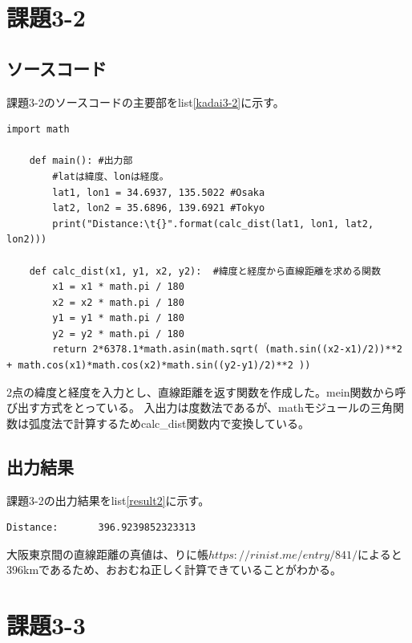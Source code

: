 \documentclass[a4paper]{ltjsarticle}
\begin{document}
\section*{課題3-2}
\subsection*{ソースコード}
課題3-2のソースコードの主要部をlist\ref{kadai3-2}に示す。
\begin{lstlisting}[caption=kadai3-2.py,label=kadai3-2]
    import math

    def main(): #出力部
        #latは緯度、lonは経度。
        lat1, lon1 = 34.6937, 135.5022 #Osaka
        lat2, lon2 = 35.6896, 139.6921 #Tokyo
        print("Distance:\t{}".format(calc_dist(lat1, lon1, lat2, lon2)))

    def calc_dist(x1, y1, x2, y2):  #緯度と経度から直線距離を求める関数
        x1 = x1 * math.pi / 180
        x2 = x2 * math.pi / 180
        y1 = y1 * math.pi / 180
        y2 = y2 * math.pi / 180
        return 2*6378.1*math.asin(math.sqrt( (math.sin((x2-x1)/2))**2 + math.cos(x1)*math.cos(x2)*math.sin((y2-y1)/2)**2 ))
\end{lstlisting}
2点の緯度と経度を入力とし、直線距離を返す関数を作成した。mein関数から呼び出す方式をとっている。
入出力は度数法であるが、mathモジュールの三角関数は弧度法で計算するためcalc\_dist関数内で変換している。

\subsection*{出力結果}
課題3-2の出力結果をlist\ref{result2}に示す。
\begin{lstlisting}[caption=output, label=result2]
    Distance:       396.9239852323313
\end{lstlisting}
大阪東京間の直線距離の真値は、りに帳\( https://rinist.me/entry/841/ \)によると396kmであるため、おおむね正しく計算できていることがわかる。
\newpage

\section*{課題3-3}
\end{document}
